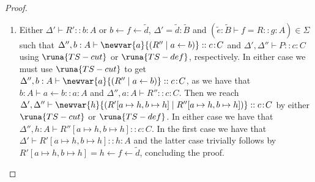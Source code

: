 \begin{theorem}
\begin{proof}
\begin{description}
\begin{enumerate}
    \item Either $\Delta' \vdash R' :: b\!:\!A$ or $b \leftarrow f \leftarrow \widetilde{d}$, $\Delta' = \widetilde{d}:\widetilde{B}$ and $(\widetilde{e} : \widetilde{B}\vdash f = R :: g\!:\!A) \in \Sigma$ such that $\Delta'',b:A\vdash \newvar{a}{(R'' \mid a \leftarrow b)} :: c\!:\!C$ and $\Delta',\Delta''\vdash P :: c\!:\!C$ using $\runa{TS-cut}$ or $\runa{TS-def}$, respectively. In either case we must use $\runa{TS-cut}$ to get $\Delta'',b:A\vdash \newvar{a}{(R'' \mid a \leftarrow b)} :: c\!:\!C$, as we have that $b:A\vdash a\leftarrow b :: a\!:\!A$ and $\Delta'',a:A\vdash R'' :: c\!:\!C$. Then we reach $\Delta',\Delta''\vdash\newvar{h}{(R'[a\mapsto h,b\mapsto h] \mid R''[a\mapsto h,b\mapsto h])} :: c\!:\!C$ by either $\runa{TS-cut}$ or $\runa{TS-def}$. In either case we have that $\Delta'',h:A\vdash R''[a\mapsto h,b\mapsto h] :: c\!:\!C$. In the first case we have that $\Delta' \vdash R'[a\mapsto h,b\mapsto h] :: h\!:\!A$ and the latter case trivially follows by $R'[a\mapsto h,b\mapsto h] = h \leftarrow f \leftarrow \widetilde{d}$, concluding the proof.
\end{enumerate}
\end{description}





\end{proof}
\end{theorem}

